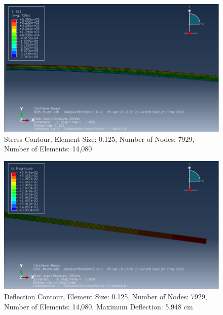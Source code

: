 \documentclass[a4paper]{article}
\begin{document}
\begin{figure}[ht]
\centering
\includegraphics[scale=.50]{3Nsize0_125Stress.PNG}
\caption{Stress Contour, Element Size: 0.125, Number of Nodes: 7929, Number of Elements: 14,080}
\end{figure}
\begin{figure}[ht]
\centering
\includegraphics[scale=.50]{3Nsize0_125MDisplacement.PNG}
\caption{Deflection Contour, Element Size: 0.125, Number of Nodes: 7929, Number of Elements: 14,080, Maximum Deflection: 5.948 cm}
\end{figure}

\clearpage
\end{document}
